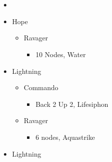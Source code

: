 \chapter[Chapter 5]{}


\renewcommand{\first}{[1] Slash \& Burn (\rav/\com)}
\renewcommand{\second}{[2] War \& Peace (\med/\com)}
\renewcommand{\third}{[3] Supersoldier (\syn/\com)}
\renewcommand{\fourth}{[4] Dualcasting (\rav/\rav)}
\renewcommand{\fifth}{[5] Dualcasting (\rav/\rav)}
\renewcommand{\sixth}{[6] Slash \& Burn (\rav/\com)}
\begin{multicols}{2}
\begin{menu}
\begin{itemize}
    \paradigm
    \begin{itemize}
        \item {}%
{\paradigmline[1]{\textit{\rav}}{\textit{\com}}{}}%
{\paradigmline{(\med)}{(\com)}{}}%
{\paradigmline{\syn}{\com}{}}%
{\paradigmline{\rav}{\rav}{}}%
{\paradigmline{\rav}{[\rav]}{}}%
{\paradigmline{[\rav]}{\com}{}}
    \end{itemize}
    \crystarium
    \begin{itemize}
        \item Hope
        \begin{itemize}
            \item Ravager
            \begin{itemize}
                \item 10 Nodes, Water
            \end{itemize}
        \end{itemize}
        \item Lightning
        \begin{itemize}
            \item Commando
            \begin{itemize}
                \item Back 2 Up 2, Lifesiphon
            \end{itemize}
            \item Ravager
            \begin{itemize}
                \item 6 nodes, Aquastrike
            \end{itemize}
        \end{itemize}
    \end{itemize}
    \equip
    \begin{itemize}
       \item Lightning

\end{itemize}
\end{itemize}
\end{menu}
\end{multicols}

